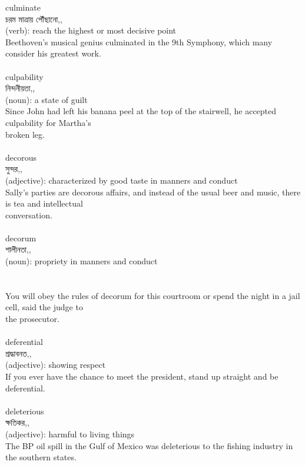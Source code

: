 \documentclass{article}
\begin{document}
{culminate}\\
{চরম মাত্রায় পৌঁছানো,,}\\
{(verb): reach the highest or most decisive point\\Beethoven's musical genius culminated in the 9th Symphony, which many consider his greatest work.\\}\\
{culpability}\\
{নিন্দনীয়তা,,}\\
{(noun): a state of guilt\\Since John had left his banana peel at the top of the stairwell, he accepted culpability for Martha's\\broken leg.\\}\\
{decorous}\\
{সুন্দর,,}\\
{(adjective): characterized by good taste in manners and conduct\\Sally's parties are decorous affairs, and instead of the usual beer and music, there is tea and intellectual\\conversation.\\}\\
{decorum}\\
{শালীনতা,,}\\
{(noun): propriety in manners and conduct\\\\                                                                                 \\You will obey the rules of decorum for this courtroom or spend the night in a jail cell, said the judge to\\the prosecutor.\\}\\
{deferential}\\
{শ্রদ্ধাবনত,,}\\
{(adjective): showing respect\\If you ever have the chance to meet the president, stand up straight and be deferential.\\}\\
{deleterious}\\
{ক্ষতিকর,,}\\
{(adjective): harmful to living things\\The BP oil spill in the Gulf of Mexico was deleterious to the fishing industry in the southern states.\\}\\
\end{document}
